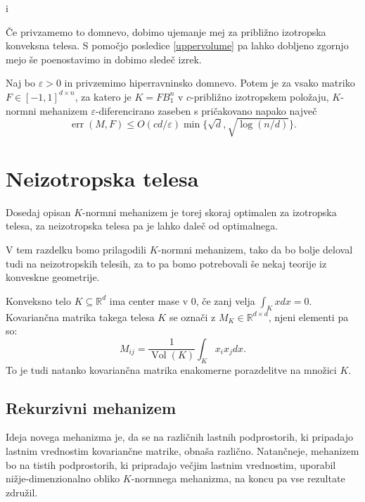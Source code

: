 i\documentclass[mat1]{fmfdelo}
\newcommand{\R}{\mathbb R}
\DeclareMathOperator{\Vol}{Vol}
\DeclareMathOperator*{\err}{err}
\begin{document}
Če privzamemo to domnevo, dobimo ujemanje mej za približno izotropska konveksna telesa. S pomočjo posledice \ref{uppervolume} pa lahko dobljeno zgornjo mejo še poenostavimo in dobimo sledeč izrek.

\begin{izrek}
    Naj bo $\varepsilon>0$ in privzemimo hiperravninsko domnevo. Potem je za vsako matriko $F \in [-1,1]^{d\times n}$, za katero je $K=FB_1^n$ v $c$-približno izotropskem položaju, $K$-normni mehanizem $\varepsilon$-diferencirano zaseben s pričakovano napako največ
    \begin{equation*}
        \err(M, F) \leq O(cd/\varepsilon) \min\{\sqrt{d}, \sqrt{\log(n/d)}\}.
    \end{equation*}
\end{izrek}

\section{Neizotropska telesa} \label{nim}

Dosedaj opisan $K$-normni mehanizem je torej skoraj optimalen za izotropska telesa, za neizotropska telesa pa je lahko daleč od optimalnega.

V tem razdelku bomo prilagodili $K$-normni mehanizem, tako da bo bolje deloval tudi na neizotropskih telesih, za to pa bomo potrebovali še nekaj teorije iz konveskne geometrije.

\begin{definicija}
    Konveksno telo $K\subseteq \R^d$ ima center mase v 0, če zanj velja $\int_K xdx = 0$. Kovariančna matrika takega telesa $K$ se označi z $M_K \in \R^{d\times d}$, njeni elementi pa so:
    \begin{equation*}
        M_{ij} = \frac{1}{\Vol(K)} \int_K x_i x_j dx.
    \end{equation*}
    To je tudi natanko kovariančna matrika enakomerne porazdelitve na množici $K$.
\end{definicija}

\subsection{Rekurzivni mehanizem}

Ideja novega mehanizma je, da se na raz\-ličnih lastnih podprostorih, ki pripadajo lastnim vrednostim kovariančne matrike, obnaša različno. Natančneje, mehanizem bo na tistih podprostorih, ki pripradajo večjim lastnim vrednostim, uporabil nižje-dimenzionalno obliko $K$-normnega mehanizma, na koncu pa vse rezultate združil.
\end{document}
